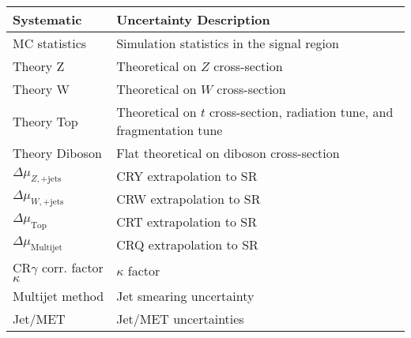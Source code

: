 \begin{table}[tbp]
\scriptsize
\begin{center}
\begin{tabular}{| l | l |}
\hline
Systematic                        & Uncertainty Description                                                   \\
\hline\hline
MC statistics                     & Simulation statistics in the signal region                                \\ \hline
Theory Z                          & Theoretical  on $Z$ cross-section                                         \\ \hline
Theory W                          & Theoretical  on $W$ cross-section                                         \\ \hline
Theory Top                        & Theoretical  on $t$ cross-section, radiation tune, and fragmentation tune \\ \hline
Theory Diboson                    & Flat theoretical on diboson cross-section                                 \\ \hline
$\Delta\mu_{Z,\mathrm{+jets}}$    & CRY extrapolation to SR                                                   \\ \hline
$\Delta\mu_{W,\mathrm{+jets}}$    & CRW extrapolation to SR                                                   \\ \hline
$\Delta\mu_{\mathrm{ Top}}$       & CRT extrapolation to SR                                                   \\ \hline
$\Delta\mu_{\mathrm{ Multijet}}$ & CRQ extrapolation to SR                                                   \\ \hline
CR$\gamma$ corr. factor $\kappa$  & $\kappa$ factor                                                           \\ \hline
Multijet method                   & Jet smearing uncertainty                                                  \\ \hline
Jet/MET                           & Jet/MET uncertainties                                                     \\ \hline

\end{tabular}
\end{center}
\end{table}
